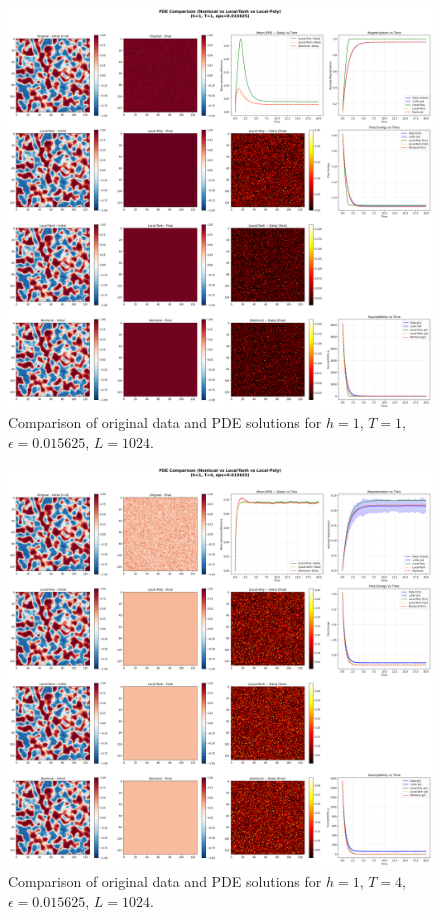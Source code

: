 \documentclass[11pt,a4paper]{article}
\begin{document}
\begin{figure}[!h]
    \centering
    \includegraphics[width=1.0\textwidth]{fig/compare_pde_solvers_L1024_h1_T1_eps0.015625.png}
    \caption{Comparison of original data and PDE solutions for $h=1$, $T=1$, $\epsilon=0.015625$, $L=1024$.}
    \label{fig:pde_comparison_h1_T1_eps0.015625}
\end{figure}


\begin{figure}[!h]
    \centering
    \includegraphics[width=1.0\textwidth]{fig/compare_pde_solvers_L1024_h1_T4_eps0.015625.png}
    \caption{Comparison of original data and PDE solutions for $h=1$, $T=4$, $\epsilon=0.015625$, $L=1024$.}
    \label{fig:pde_comparison_h1_T4_eps0.015625}
\end{figure}
\end{document}
